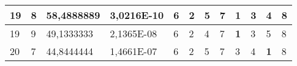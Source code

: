 \documentclass[conference]{IEEEtran}
\begin{document}
\begin{table*}[]
\begin{tabular}{|llll|llllllll|}
\multicolumn{1}{|l|}{19}                                                    & \multicolumn{1}{l|}{8}                                                        & \multicolumn{1}{l|}{58,4888889}                                                   & 3,0216E-10                     & \multicolumn{1}{l|}{6}                                                  & \multicolumn{1}{l|}{2}                                                  & \multicolumn{1}{l|}{5}                                                  & \multicolumn{1}{l|}{7}                                                  & \multicolumn{1}{l|}{\textbf{1}}                                         & \multicolumn{1}{l|}{3}                                                  & \multicolumn{1}{l|}{4}                                                  & 8                          \\ \hline
\multicolumn{1}{|l|}{19}                                                    & \multicolumn{1}{l|}{9}                                                        & \multicolumn{1}{l|}{49,1333333}                                                   & 2,1365E-08                     & \multicolumn{1}{l|}{6}                                                  & \multicolumn{1}{l|}{2}                                                  & \multicolumn{1}{l|}{4}                                                  & \multicolumn{1}{l|}{7}                                                  & \multicolumn{1}{l|}{\textbf{1}}                                         & \multicolumn{1}{l|}{3}                                                  & \multicolumn{1}{l|}{5}                                                  & 8                          \\ \hline
\multicolumn{1}{|l|}{20}                                                    & \multicolumn{1}{l|}{7}                                                        & \multicolumn{1}{l|}{44,8444444}                                                   & 1,4661E-07                     & \multicolumn{1}{l|}{6}                                                  & \multicolumn{1}{l|}{2}                                                  & \multicolumn{1}{l|}{5}                                                  & \multicolumn{1}{l|}{7}                                                  & \multicolumn{1}{l|}{3}                                                  & \multicolumn{1}{l|}{4}                                                  & \multicolumn{1}{l|}{\textbf{1}}                                         & 8                          \\ \hline

\end{tabular}
\end{table*}
\end{document}
